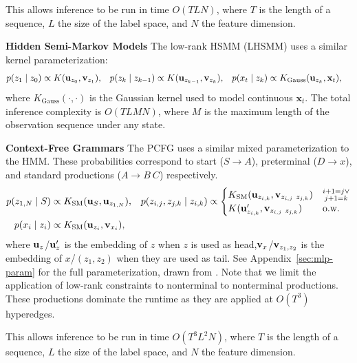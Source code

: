 \documentclass{article}
\begin{document}
This allows inference to be run in time $O(TLN)$, where $T$ is the length of a sequence, $L$ the size of the label space, and $N$ the feature dimension.

\textbf{Hidden Semi-Markov Models} The low-rank HSMM (LHSMM) uses a similar kernel parameterization:
\begin{equation}
\label{eqn:hsmm}
\begin{aligned}
p(z_1 \mid z_0) &\propto K(\mathbf{u}_{z_0}, \mathbf{v}_{z_1}),&
p(z_k \mid z_{k-1}) &\propto K(\mathbf{u}_{z_{k-1}}, \mathbf{v}_{z_k}),&
p(x_t \mid z_k) &\propto K_{\text{Gauss}}(\mathbf{u}_{z_k}, \mathbf{x}_t),
\end{aligned}
\end{equation}
where $K_{\text{Gauss}}(\cdot, \cdot)$ is the Gaussian kernel used to model continuous $\mathbf{x}_t$. The total inference complexity is $O(TLMN )$, where $M$ is the maximum length of the observation sequence under any state.

\textbf{Context-Free Grammars}
The PCFG uses a similar mixed parameterization to the HMM.
These probabilities correspond to start ($S\to A$), preterminal ($D\to x$),
and standard productions ($A\to B\ C$) respectively.
\begin{equation}
\label{eqn:pcfg}
\begin{aligned}
p(z_{1,N} \mid S ) &\propto K_{\mathrm{SM}}(\mathbf{u}_{S}, \mathbf{u}_{z_{1,N}}),&
p( z_{i,j}, z_{j,k} \mid z_{i,k}) &\propto \begin{cases}
  K_{\mathrm{SM}}(\mathbf{u}_{z_{i,k}}, \mathbf{v}_{z_{i,j}\ z_{j,k}}) & \substack{i+1 = j \lor \\j+1=k} \\ 
 K(\mathbf{u}_{z_{i,k}}', \mathbf{v}_{z_{i,j}\ z_{j,k}}) &\text{o.w.} \\
\end{cases}\\
 p(x_i \mid z_i) &\propto K_{\mathrm{SM}}(\mathbf{u}_{z_i}, \mathbf{v}_{x_i}),\\
\end{aligned}
\end{equation}
where $\mathbf{u}_{z}$/$\mathbf{u}_z'$ is the embedding of $z$ when $z$ is used as head,$\mathbf{v}_{x}$/$\mathbf{v}_{z_1, z_2}$ is the embedding of $x$/$(z_1, z_2)$ when they are used as tail. See Appendix~\ref{sec:mlp-param} for the full
parameterization, drawn from \citet{kim2019cpcfg}. Note that we limit
the application of low-rank constraints to nonterminal to nonterminal
productions. These productions dominate the runtime as they
are applied at $O(T^3)$ hyperedges.

This allows inference to be run in time $O(T^3L^2N)$, where $T$ is the length of a sequence, $L$ the size of the label space, and $N$ the feature dimension.
\end{document}
